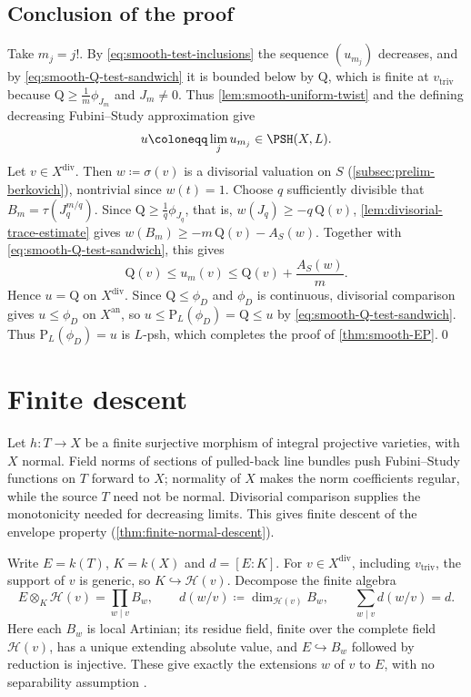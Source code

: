 \documentclass[11pt,a4paper]{article}
\newcommand{\an}{\mathrm{an}}          %
\newcommand{\divv}{\mathrm{div}}       %
\newcommand{\vtriv}{v_{\mathrm{triv}}} %
\begin{document}
\subsection*{Conclusion of the proof}

Take $m_j=j!$. By \eqref{eq:smooth-test-inclusions} the sequence $(u_{m_j})$ decreases, and by \eqref{eq:smooth-Q-test-sandwich} it is bounded below by $\mathrm{Q}$, which is finite at $\vtriv$ because $\mathrm{Q}\geq\frac1m\phi_{J_m}$ and $J_m\neq0$. Thus \cref{lem:smooth-uniform-twist} and the defining decreasing Fubini--Study approximation \cite[Definition~4.1]{BJ22} give
\[
 u\coloneqq\lim_j u_{m_j}\in\PSH(X,L).
\]
Let $v\in X^{\divv}$. Then $w\coloneqq\sigma(v)$ is a divisorial valuation on $S$ (\cref{subsec:prelim-berkovich}), nontrivial since $w(t)=1$. Choose $q$ sufficiently divisible that $B_m=\tau(J_q^{m/q})$. Since $\mathrm Q\ge\frac1q\phi_{J_q}$, that is, $w(J_q)\geq-q\,\mathrm Q(v)$, \cref{lem:divisorial-trace-estimate} gives $w(B_m)\geq-m\,\mathrm Q(v)-A_S(w)$. Together with \eqref{eq:smooth-Q-test-sandwich}, this gives
\[
 \mathrm{Q}(v)\leq u_m(v)\leq\mathrm{Q}(v)+\frac{A_S(w)}m.
\]
Hence $u=\mathrm{Q}$ on $X^{\divv}$. Since $\mathrm Q\le\phi_D$ and $\phi_D$ is continuous, divisorial comparison gives $u\le\phi_D$ on $X^{\an}$, so $u\le\mathrm P_L(\phi_D)=\mathrm Q\le u$ by \eqref{eq:smooth-Q-test-sandwich}. Thus $\mathrm P_L(\phi_D)=u$ is $L$-psh, which completes the proof of \cref{thm:smooth-EP}.\qed

\section{Finite descent}
\label{sec:finite-descent}

Let $h\colon T\to X$ be a finite surjective morphism of integral projective varieties, with $X$ normal. Field norms of sections of pulled-back line bundles push Fubini--Study functions on $T$ forward to $X$; normality of $X$ makes the norm coefficients regular, while the source $T$ need not be normal. Divisorial comparison supplies the monotonicity needed for decreasing limits. This gives finite descent of the envelope property (\cref{thm:finite-normal-descent}).

Write $E=k(T)$, $K=k(X)$ and $d=[E:K]$.  For $v\in X^{\divv}$, including $\vtriv$, the support of $v$ is generic, so $K\hookrightarrow\mathcal H(v)$.  Decompose the finite algebra
\[
 E\otimes_K\mathcal H(v)=\prod_{w\mid v}B_w,
 \qquad d(w/v)\coloneqq\dim_{\mathcal H(v)}B_w,
 \qquad\sum_{w\mid v}d(w/v)=d.
\]
Here each $B_w$ is local Artinian; its residue field, finite over the complete field $\mathcal H(v)$, has a unique extending absolute value, and $E\hookrightarrow B_w$ followed by reduction is injective.  These give exactly the extensions $w$ of $v$ to $E$, with no separability assumption \cite[Ch.~VI, \S8]{AC}.
\end{document}

